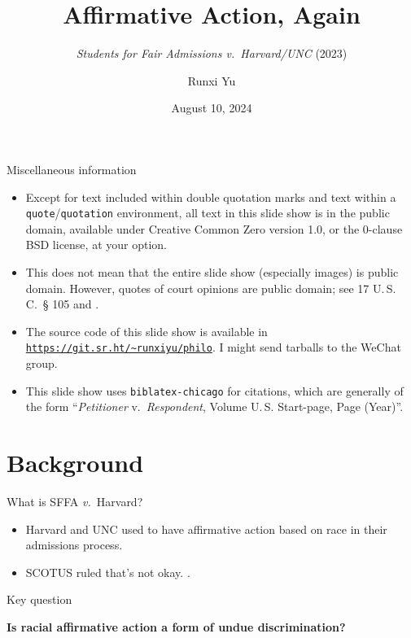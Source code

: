 \documentclass[ignorenonframetext, aspectratio=169]{beamer}
\title{Affirmative Action, Again}
\subtitle{\textit{Students for Fair Admissions \textup{v.}\ Harvard/UNC} (2023)}
\author{Runxi Yu}
\date{August 10, 2024}
\begin{document}



\begin{frame}[fragile]{Miscellaneous information}
\begin{itemize}
	\item Except for text included within double quotation marks and text within a \verb|quote|/\verb|quotation| environment, all text in this slide show is in the public domain, available under Creative Common Zero version 1.0, or the 0-clause BSD license, at your option.
	\item This does not mean that the entire slide show (especially images) is public domain. However, quotes of court opinions are public domain; see 17 U.\,S.\,C.\ {\S} 105 and .
	\item The source code of this slide show is available in \href{https://git.sr.ht/~runxiyu/philo}{\texttt{https://git.sr.ht/\~{}runxiyu/philo}}. I might send tarballs to the WeChat group.
	\item This slide show uses \texttt{biblatex-chicago} for citations, which are generally of the form ``\textit{Petitioner} v.\ \textit{Respondent}, Volume U.\,S. Start-page, Page (Year)''.
\end{itemize}
\end{frame}

\section{Background}

\begin{frame}{What is SFFA \textit{v.}\ Harvard?}
\begin{itemize}
	\item Harvard and UNC used to have affirmative action based on race in their admissions process.
	\item SCOTUS ruled that's not okay. .
\end{itemize}
\end{frame}

\begin{frame}{Key question}
\begin{center}\bfseries
	Is racial affirmative action a form of undue discrimination?
\end{center}
\end{frame}
\end{document}
